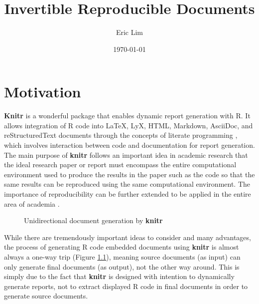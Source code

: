 \documentclass[a4paper, 12pt]{report}
\title{\textbf{Invertible Reproducible Documents}}
\author{Eric Lim}
\date{\today}
\begin{document}
  \maketitle


\chapter{Motivation}
\label{ch:motiv}


\textbf{Knitr} \citep{knitr} is a wonderful package that enables dynamic report generation with R. It allows integration of R code into LaTeX, LyX, HTML, Markdown, AsciiDoc, and reStructuredText documents through the concepts of literate programming \citep{knu84}, which involves interaction between code and documentation for report generation. The main purpose of \textbf{knitr} follows an important idea in academic research that the ideal research paper or report must encompass the entire computational environment used to produce the results in the paper such as the code so that the same results can be reproduced using the same computational environment. The importance of reproducibility can be further extended to be applied in the entire area of academia \citep{lee01}.

\begin{figure}[h]
\centering
  \caption{Unidirectional document generation by \textbf{knitr}}
  \label{fig:1}
\end{figure}

While there are tremendously important ideas to consider and many advantages, the process of generating R code embedded documents using \textbf{knitr} is almost always a one-way trip (Figure \ref{fig:1}), meaning source documents (as input) can only generate final documents (as output), not the other way around. This is simply due to the fact that \textbf{knitr} is designed with intention to dynamically generate reports, not to extract displayed R code in final documents in order to generate source documents.
\end{document}
